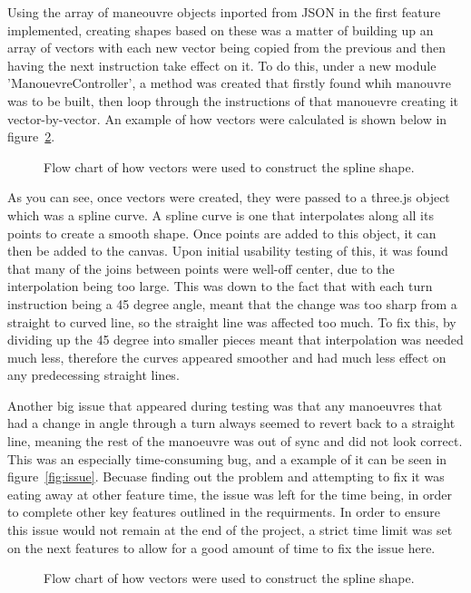 Using the array of maneouvre objects inported from JSON in the first feature implemented, creating shapes based on these was a matter of building up an array of vectors with each new vector being copied from the previous and then having the next instruction take effect on it. To do this, under a new module 'ManouevreController', a method was created that firstly found whih manouvre was to be built, then loop through the instructions of that manouevre creating it vector-by-vector. An example of how vectors were calculated is shown below in figure~\ref{fig:vectors}.

\begin{figure}[h]
  \centering
  \caption{Flow chart of how vectors were used to construct the spline shape.}
  \label{fig:vectors}
\end{figure}

As you can see, once vectors were created, they were passed to a three.js object which was a spline curve. A spline curve is one that interpolates along all its points to create a smooth shape. Once points are added to this object, it can then be added to the canvas. Upon initial usability testing of this, it was found that many of the joins between points were well-off center, due to the interpolation being too large. This was down to the fact that with each turn instruction being a 45 degree angle, meant that the change was too sharp from a straight to curved line, so the straight line was affected too much. To fix this, by dividing up the 45 degree into smaller pieces meant that interpolation was needed much less, therefore the curves appeared smoother and had much less effect on any predecessing straight lines.

Another big issue that appeared during testing was that any manoeuvres that had a change in angle through a turn always seemed to revert back to a straight line, meaning the rest of the manoeuvre was out of sync and did not look correct. This was an especially time-consuming bug, and a example of it can be seen in figure~\ref{fig:issue}. Becuase finding out the problem and attempting to fix it was eating away at other feature time, the issue was left for the time being, in order to complete other key features outlined in the requirments. In order to ensure this issue would not remain at the end of the project, a strict time limit was set on the next features to allow for a good amount of time to fix the issue here.

\begin{figure}[h]
  \centering
  \caption{Flow chart of how vectors were used to construct the spline shape.}
  \label{fig:vectors}
\end{figure}

